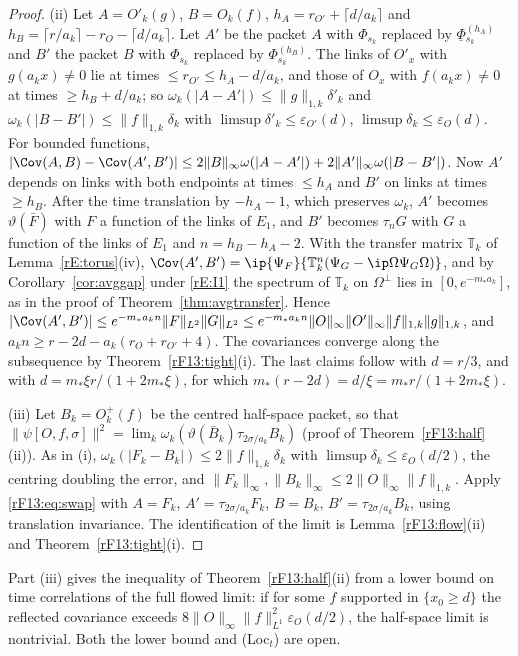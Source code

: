\begin{proof}
(ii) Let $A=O'_k(g)$, $B=O_k(f)$, $h_A=r_{O'}+\lceil d/a_k\rceil$ and $h_B=
\lceil r/a_k\rceil-r_O-\lceil d/a_k\rceil$. Let $A'$ be the packet $A$ with
$\Phi_{s_k}$ replaced by $\underline\Phi{}^{(h_A)}_{s_k}$ and $B'$ the packet
$B$ with $\Phi_{s_k}$ replaced by $\Phi^{(h_B)}_{s_k}$. The links of $O'_x$
with $g(a_kx)\ne0$ lie at times $\le r_{O'}\le h_A-d/a_k$, and those of
$O_x$ with $f(a_kx)\ne0$ at times $\ge h_B+d/a_k$; so $\omega_k(|A-A'|)\le
\|g\|_{1,k}\delta'_k$ and $\omega_k(|B-B'|)\le\|f\|_{1,k}\delta_k$ with
$\limsup\delta'_k\le\varepsilon_{O'}(d)$, $\limsup\delta_k\le\varepsilon_O(d)$.
For bounded functions, $|\Cov(A,B)-\Cov(A',B')|\le2\|B\|_\infty\omega(|A-A'|)
+2\|A'\|_\infty\omega(|B-B'|)$. Now $A'$ depends on links with both endpoints
at times $\le h_A$ and $B'$ on links at times $\ge h_B$. After the time
translation by $-h_A-1$, which preserves $\omega_k$, $A'$ becomes
$\vartheta(\bar F)$ with $F$ a function of the links of $E_1$, and $B'$
becomes $\tau_nG$ with $G$ a function of the links of $E_1$ and
$n=h_B-h_A-2$. With the transfer matrix $\mathbb T_k$ of
Lemma~\ref{rE:torus}(iv), $\Cov(A',B')=\ip{\Psi_F}{\mathbb T_k^n(\Psi_G-
\ip\Omega{\Psi_G}\Omega)}$, and by Corollary~\ref{cor:avggap} under
\ref{rE:I1} the spectrum of $\mathbb T_k$ on $\Omega^\perp$ lies in
$[0,e^{-m_*a_k}]$, as in the proof of Theorem~\ref{thm:avgtransfer}. Hence
$|\Cov(A',B')|\le e^{-m_*a_kn}\|F\|_{L^2}\|G\|_{L^2}\le e^{-m_*a_kn}
\|O\|_\infty\|O'\|_\infty\|f\|_{1,k}\|g\|_{1,k}$, and $a_kn\ge r-2d-a_k(r_O+
r_{O'}+4)$. The covariances converge along the subsequence by
Theorem~\ref{rF13:tight}(i). The last claims follow with $d=r/3$, and with
$d=m_*\xi r/(1+2m_*\xi)$, for which $m_*(r-2d)=d/\xi=m_*r/(1+2m_*\xi)$.

(iii) Let $B_k=O^+_k(f)$ be the centred half-space packet, so that
$\|\psi[O,f,\sigma]\|^2=\lim_k\omega_k(\vartheta(\bar B_k)\tau_{2\sigma/a_k}B_k)$
(proof of Theorem~\ref{rF13:half}(ii)). As in (i), $\omega_k(|F_k-B_k|)\le
2\|f\|_{1,k}\delta_k$ with $\limsup\delta_k\le\varepsilon_O(d/2)$, the centring
doubling the error, and $\|F_k\|_\infty,\|B_k\|_\infty\le2\|O\|_\infty
\|f\|_{1,k}$. Apply \eqref{rF13:eq:swap} with $A=F_k$, $A'=\tau_{2\sigma/
a_k}F_k$, $B=B_k$, $B'=\tau_{2\sigma/a_k}B_k$, using translation invariance.
The identification of the limit is Lemma~\ref{rF13:flow}(ii) and
Theorem~\ref{rF13:tight}(i).
\end{proof}

Part (iii) gives the inequality of Theorem~\ref{rF13:half}(ii) from a lower
bound on time correlations of the full flowed limit: if for some $f$
supported in $\{x_0\ge d\}$ the reflected covariance exceeds
$8\|O\|_\infty\|f\|_{L^1}^2\varepsilon_O(d/2)$, the half-space limit is
nontrivial. Both the lower bound and (Loc$_t$) are open.

